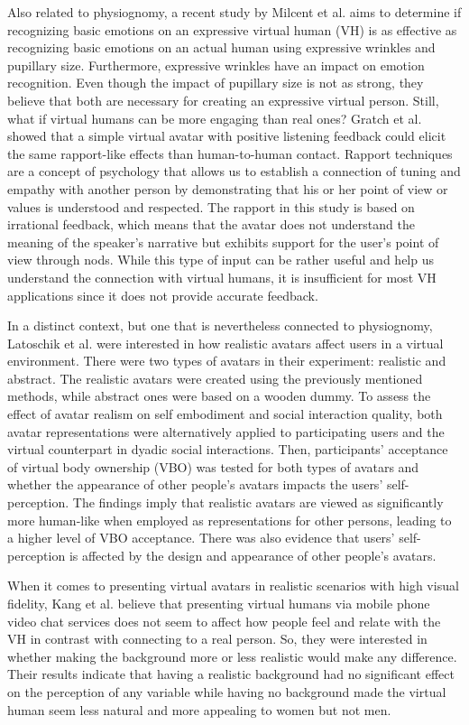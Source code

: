 Also related to physiognomy, a recent study by Milcent et al. \cite{MIL19} aims to determine if recognizing basic emotions on an expressive virtual human (VH) is as effective as recognizing basic emotions on an actual human using expressive wrinkles and pupillary size. Furthermore, expressive wrinkles have an impact on emotion recognition. Even though the impact of pupillary size is not as strong, they believe that both are necessary for creating an expressive virtual person. 
Still, what if virtual humans can be more engaging than real ones? Gratch et al. \cite{GRA07} showed that a simple virtual avatar with positive listening feedback could elicit the same rapport-like effects than human-to-human contact. Rapport techniques are a concept of psychology that allows us to establish a connection of tuning and empathy with another person by demonstrating that his or her point of view or values is understood and respected. The rapport in this study is based on irrational feedback, which means that the avatar does not understand the meaning of the speaker's narrative but exhibits support for the user's point of view through nods. While this type of input can be rather useful and help us understand the connection with virtual humans, it is insufficient for most VH applications since it does not provide accurate feedback. 

In a distinct context, but one that is nevertheless connected to physiognomy, Latoschik et al. \cite{LAT17} were interested in how realistic avatars affect users in a virtual environment. There were two types of avatars in their experiment: realistic and abstract. The realistic avatars were created using the previously mentioned methods, while abstract ones were based on a wooden dummy. To assess the effect of avatar realism on self embodiment and social interaction quality, both avatar representations were alternatively applied to participating users and the virtual counterpart in dyadic social interactions. Then, participants' acceptance of virtual body ownership (VBO) was tested for both types of avatars and whether the appearance of other people's avatars impacts the users' self-perception. The findings imply that realistic avatars are viewed as significantly more human-like when employed as representations for other persons, leading to a higher level of VBO acceptance. There was also evidence that users' self-perception is affected by the design and appearance of other people's avatars.

When it comes to presenting virtual avatars in realistic scenarios with high visual fidelity, Kang et al. \cite{KAN16} believe that presenting virtual humans via mobile phone video chat services does not seem to affect how people feel and relate with the VH in contrast with connecting to a real person. So, they were interested in whether making the background more or less realistic would make any difference. Their results indicate that having a realistic background had no significant effect on the perception of any variable while having no background made the virtual human seem less natural and more appealing to women but not men.


